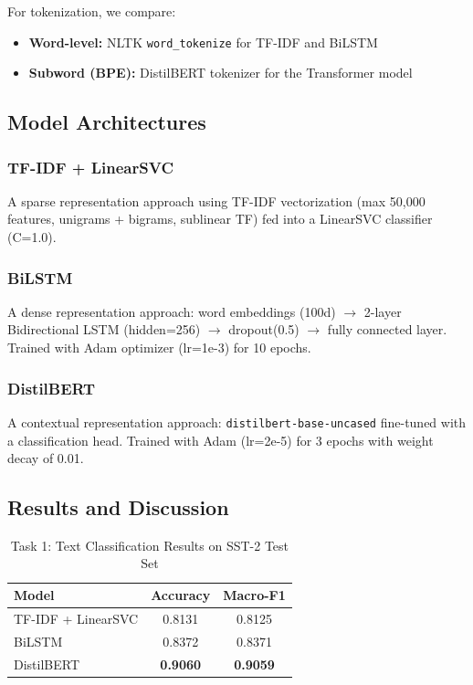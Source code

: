 \documentclass[12pt, a4paper]{article}
\begin{document}
For tokenization, we compare:
\begin{itemize}
    \item \textbf{Word-level:} NLTK \texttt{word\_tokenize} for TF-IDF and BiLSTM
    \item \textbf{Subword (BPE):} DistilBERT tokenizer for the Transformer model
\end{itemize}

\subsection{Model Architectures}

\subsubsection{TF-IDF + LinearSVC}
A sparse representation approach using TF-IDF vectorization (max 50,000 features, unigrams + bigrams, sublinear TF) fed into a LinearSVC classifier (C=1.0).

\subsubsection{BiLSTM}
A dense representation approach: word embeddings (100d) $\rightarrow$ 2-layer Bidirectional LSTM (hidden=256) $\rightarrow$ dropout(0.5) $\rightarrow$ fully connected layer. Trained with Adam optimizer (lr=1e-3) for 10 epochs.

\subsubsection{DistilBERT}
A contextual representation approach: \texttt{distilbert-base-uncased} fine-tuned with a classification head. Trained with Adam (lr=2e-5) for 3 epochs with weight decay of 0.01.

\subsection{Results and Discussion}

\begin{table}[H]
\centering
\caption{Task 1: Text Classification Results on SST-2 Test Set}
\label{tab:task1_results}
\begin{tabular}{lcc}
\toprule
\textbf{Model} & \textbf{Accuracy} & \textbf{Macro-F1} \\
\midrule
TF-IDF + LinearSVC & 0.8131 & 0.8125 \\
BiLSTM & 0.8372 & 0.8371 \\
DistilBERT & \textbf{0.9060} & \textbf{0.9059} \\
\bottomrule
\end{tabular}
\end{table}
\end{document}
